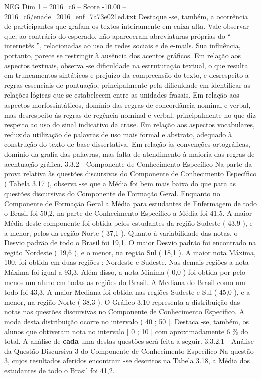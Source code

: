 \begin{textsample}{NEG Dim 1 – 2016\_c6 – Score -10.00 – 2016\_c6/enade\_2016\_enf\_7a73e021ed.txt}
Destaque -se, também, a ocorrência de participantes que grafam os textos inteiramente em caixa alta.
Vale observar que, ao contrário do esperado, não apareceram abreviaturas próprias do “ internetês ”, relacionadas ao uso de redes sociais e de e-mails.
Sua influência, portanto, parece se restringir à ausência dos acentos gráficos.
Em relação aos aspectos textuais, observa -se dificuldade na estruturação textual, o que resulta em truncamentos sintáticos e prejuízo da compreensão do texto, e desrespeito a regras essenciais de pontuação, principalmente pela dificuldade em identificar as relações lógicas que se estabelecem entre as unidades frasais.
Em relação aos aspectos morfossintáticos, domínio das regras de concordância nominal e verbal, mas desrespeito às regras de regência nominal e verbal, principalmente no que diz respeito ao uso do sinal indicativo da crase.
Em relação aos aspectos vocabulares, reduzida utilização de palavras de uso mais formal e abstrato, adequado à construção do texto de base dissertativa.
Em relação às convenções ortográficas, domínio da grafia das palavras, mas falta de atendimento à maioria das regras de acentuação gráfica. 3.3.2 - Componente de Conhecimento Específico Na parte da prova relativa às questões discursivas do Componente de Conhecimento Específico ( Tabela 3.17 ), observa -se que a Média foi bem mais baixa do que para as questões discursivas do Componente de Formação Geral.
Enquanto no Componente de Formação Geral a Média para estudantes de Enfermagem de todo o Brasil foi 50,2, na parte de Conhecimento Específico a Média foi 41,5.
A maior Média deste componente foi obtida pelos estudantes da região Sudeste ( 43,9 ), e a menor, pelos da região Norte ( 37,1 ).
Quanto à variabilidade das notas, o Desvio padrão de todo o Brasil foi 19,1.
O maior Desvio padrão foi encontrado na região Nordeste ( 19,6 ), e o menor, na região Sul ( 18,1 ).
A maior nota Máxima, 100, foi obtida em duas regiões : Nordeste e Sudeste.
Nas demais regiões a nota Máxima foi igual a 93,3.
Além disso, a nota Mínima ( 0,0 ) foi obtida por pelo menos um aluno em todas as regiões do Brasil.
A Mediana do Brasil como um todo foi 43,3.
A maior Mediana foi obtida nas regiões Sudeste e Sul ( 45,0 ), e a menor, na região Norte ( 38,3 ).
O Gráfico 3.10 representa a distribuição das notas nas questões discursivas no Componente de Conhecimento Específico.
A moda desta distribuição ocorre no intervalo ( 40 ; 50 ].
Destaca -se, também, os alunos que obtiveram nota no intervalo [ 0 ; 10 ] com aproximadamente 6 \% do total.
A análise de \textbf{cada} uma destas questões será feita a seguir. 3.3.2.1 - Análise da Questão Discursiva 3 do Componente de Conhecimento Específico Na questão 3, cujos resultados aferidos encontram -se descritos na Tabela 3.18, a Média dos estudantes de todo o Brasil foi 41,2.

\end{textsample}
